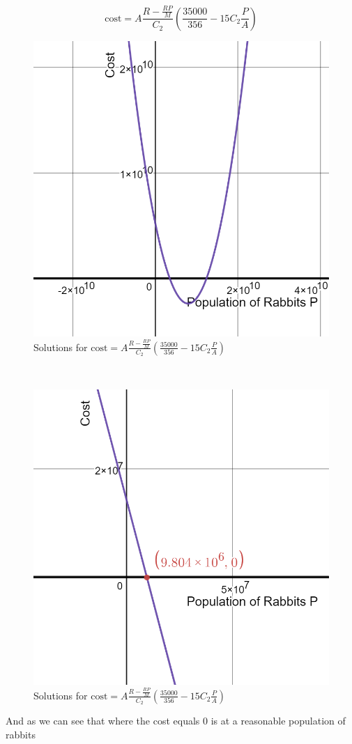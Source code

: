 \documentclass{article}
\begin{document}
$$\text{cost} = A\frac{R-\frac{RP}{M}}{C_2}(\frac{35000}{356}  -15C_2 \frac{P}{A}) $$
\begin{figure}[h!]
	\centering
	\includegraphics[scale=0.3]{Pictures/CostH}
	\caption{Solutions for $\text{cost} = A\frac{R-\frac{RP}{M}}{C_2}(\frac{35000}{356}  -15C_2 \frac{P}{A}) $ }
	\label{fig:Cost1}
\end{figure}
\\
\begin{figure}[h!]
	\centering
	\includegraphics[scale=0.3]{Pictures/CostH2}
	\caption{Solutions for $\text{cost} = A\frac{R-\frac{RP}{M}}{C_2}(\frac{35000}{356}  -15C_2 \frac{P}{A}) $ }
	\label{fig:Cost2}
\end{figure}
\newpage
And as we can see that where the cost equals 0 is at a reasonable population of rabbits
\end{document}
